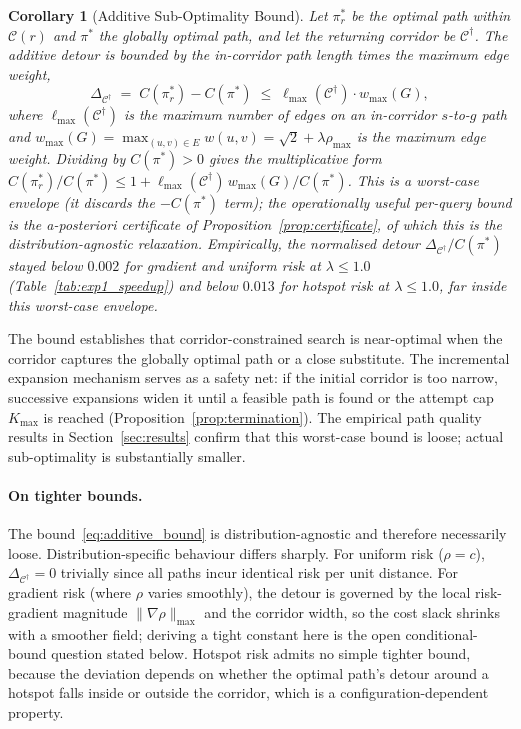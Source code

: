 \documentclass[preprint,12pt,authoryear]{elsarticle}
\newtheorem{corollary}{Corollary}
\begin{document}
\begin{corollary}[Additive Sub-Optimality Bound]\label{cor:bound}
Let $\pi_r^*$ be the optimal path within $\mathcal{C}(r)$ and $\pi^*$ the globally optimal path, and let the returning corridor be $\mathcal{C}^{\dagger}$. The additive detour is bounded by the in-corridor path length times the maximum edge weight,
\begin{equation}\label{eq:additive_bound}
\Delta_{\mathcal{C}^{\dagger}} \;=\; C(\pi_r^*) - C(\pi^*) \;\leq\; \ell_{\max}(\mathcal{C}^{\dagger}) \cdot w_{\max}(G),
\end{equation}
where $\ell_{\max}(\mathcal{C}^{\dagger})$ is the maximum number of edges on an in-corridor $s$-to-$g$ path and $w_{\max}(G) = \max_{(u,v) \in E} w(u,v) = \sqrt{2} + \lambda\rho_{\max}$ is the maximum edge weight. Dividing by $C(\pi^*) > 0$ gives the multiplicative form $C(\pi_r^*)/C(\pi^*) \leq 1 + \ell_{\max}(\mathcal{C}^{\dagger})\,w_{\max}(G)/C(\pi^*)$. This is a worst-case envelope (it discards the $-C(\pi^*)$ term); the operationally useful per-query bound is the a-posteriori certificate of Proposition~\ref{prop:certificate}, of which this is the distribution-agnostic relaxation.
Empirically, the normalised detour $\Delta_{\mathcal{C}^{\dagger}}/C(\pi^*)$ stayed below $0.002$ for gradient and uniform risk at $\lambda \leq 1.0$ (Table~\ref{tab:exp1_speedup}) and below $0.013$ for hotspot risk at $\lambda \leq 1.0$, far inside this worst-case envelope.
\end{corollary}

The bound establishes that corridor-constrained search is near-optimal when the corridor captures the globally optimal path or a close substitute.
The incremental expansion mechanism serves as a safety net: if the initial corridor is too narrow, successive expansions widen it until a feasible path is found or the attempt cap $K_{\max}$ is reached (Proposition~\ref{prop:termination}).
The empirical path quality results in Section~\ref{sec:results} confirm that this worst-case bound is loose; actual sub-optimality is substantially smaller.

\paragraph{On tighter bounds.}
The bound~\eqref{eq:additive_bound} is distribution-agnostic and therefore necessarily loose.
Distribution-specific behaviour differs sharply. For uniform risk ($\rho = c$), $\Delta_{\mathcal{C}^{\dagger}} = 0$ trivially since all paths incur identical risk per unit distance.
For gradient risk (where $\rho$ varies smoothly), the detour is governed by the local risk-gradient magnitude $\|\nabla\rho\|_{\max}$ and the corridor width, so the cost slack shrinks with a smoother field; deriving a tight constant here is the open conditional-bound question stated below.
Hotspot risk admits no simple tighter bound, because the deviation depends on whether the optimal path's detour around a hotspot falls inside or outside the corridor, which is a configuration-dependent property.
\end{document}
